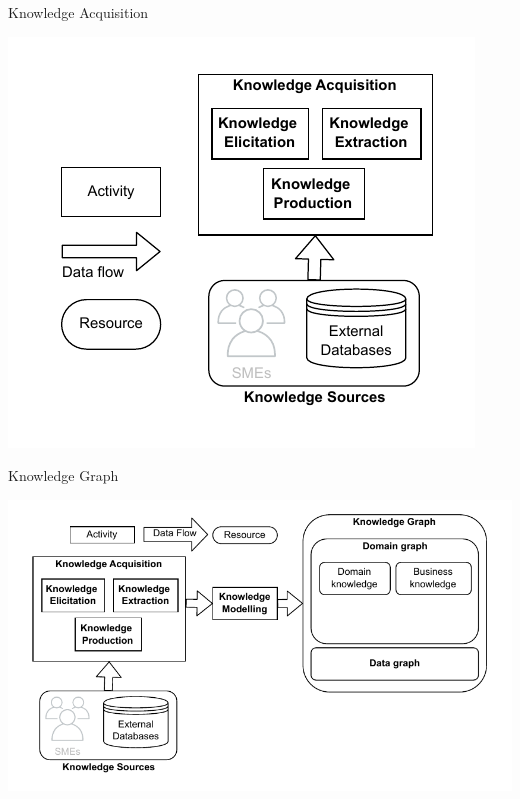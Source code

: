\begin{frame}{Knowledge Acquisition}

        \begin{center}
            \includegraphics[scale=0.9]{images/KGBS-knowledge-acquisition-legende.pdf} 
        \end{center}

\end{frame}




\begin{frame}{Knowledge Graph}

        \begin{center}
            \includegraphics[scale=0.7]{images/KGBS-knowledge-modelling-kg-legende.pdf} 
        \end{center}

\end{frame}


